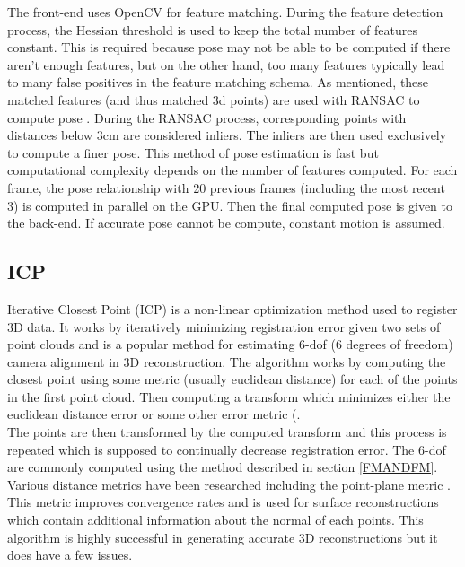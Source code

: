 The front-end uses OpenCV \cite{Bradski08Learning} for feature matching. During the feature detection process, the Hessian threshold is used to keep the total number of features constant. This is required because pose may not be able to be computed if there aren't enough features, but on the other hand, too many features typically lead to many false positives in the feature matching schema. As mentioned, these matched features (and thus matched 3d points) are used with RANSAC to compute pose \cite{Umeyama91Least}. During the RANSAC process, corresponding points with distances below 3cm are considered inliers. The inliers are then used exclusively to compute a finer pose. This method of pose estimation is fast but computational complexity depends on the number of features computed. For each frame, the pose relationship with 20 previous frames (including the most recent 3) is computed in parallel on the GPU. Then the final computed pose is given to the back-end. If accurate pose cannot be compute, constant motion is assumed. \\

\subsection{ICP}

Iterative Closest Point (ICP) \cite{Besl92Method,Rusinkiewicz01Efficient,Segal09Generalized} is a non-linear optimization method used to register 3D data. It works by iteratively minimizing registration error given two sets of point clouds and is a popular method for estimating 6-dof (6 degrees of freedom) camera alignment in 3D reconstruction. The algorithm works by computing the closest point using some metric (usually euclidean distance) for each of the points in the first point cloud. Then computing a transform which minimizes either the euclidean distance error or some other error metric (\cite{Steinbrucker11Real,Tykkala11Direct,Kerl13Robust,Chen92Object}. \\

The points are then transformed by the computed transform and this process is repeated which is supposed to continually decrease registration error. The 6-dof are commonly computed using the method described in section \ref{FMANDFM}. Various distance metrics have been researched including the point-plane metric \cite{Chen92Object}. This metric improves convergence rates and is used for surface reconstructions which contain additional information about the normal of each points. This algorithm is highly successful in generating accurate 3D reconstructions but it does have a few issues. \\

